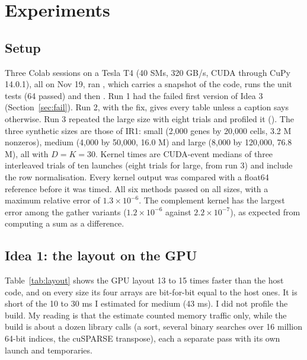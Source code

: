 \section{Experiments}
\label{sec:exp}



\subsection{Setup}

Three Colab sessions on a Tesla T4 (40 SMs, 320 GB/s, CUDA through CuPy 14.0.1), all on Nov 19, ran
, which carries a snapshot of the code, runs the unit tests (64 passed)
and then . Run 1 had the failed first version of Idea 3 (Section~\ref{sec:fail}). Run 2,
with the fix, gives every table unless a caption says otherwise. Run 3 repeated the large size with eight
trials and profiled it (). The three synthetic sizes are those of IR1: small (2,000 genes by 20,000
cells, 3.2 M nonzeros), medium (4,000 by 50,000, 16.0 M) and large (8,000 by 120,000, 76.8 M), all with
$D = K = 30$. Kernel times are CUDA-event medians of three interleaved trials of ten launches (eight trials for large,
from run 3) and include the row normalisation. Every kernel output was compared with a float64 reference before it
was timed. All six methods passed on all sizes, with a maximum relative error of $1.3 \times 10^{-6}$.
The complement kernel has the largest error among the gather variants ($1.2 \times 10^{-6}$ against
$2.2 \times 10^{-7}$), as expected from computing a sum as a difference.

\subsection{Idea 1: the layout on the GPU}

Table~\ref{tab:layout} shows the GPU layout 13 to 15 times faster than the host code, and on every size
its four arrays are bit-for-bit equal to the host ones. It is short of the 10 to 30 ms I estimated for
medium (43 ms). I did not profile the build. My reading is that the estimate counted memory traffic
only, while the build is about a dozen library calls (a sort, several binary searches over 16 million
64-bit indices, the cuSPARSE transpose), each a separate pass with its own launch and temporaries.

